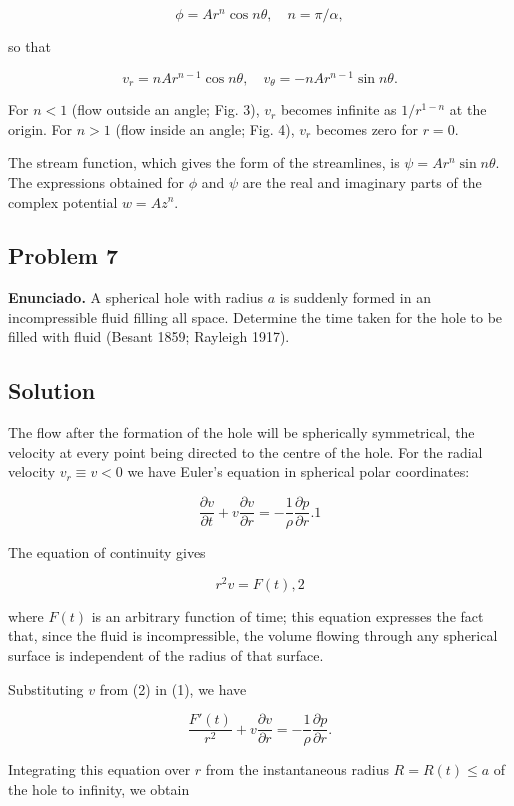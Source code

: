 \documentclass{article}
\begin{document}
$$
\phi = Ar^n \cos n\theta, \quad n = \pi/\alpha,
$$

so that

$$
v_r = nAr^{n-1} \cos n\theta, \quad v_\theta = -nAr^{n-1} \sin n\theta.
$$

For $n < 1$ (flow outside an angle; Fig. 3), $v_r$ becomes infinite as $1/r^{1-n}$ at the origin. For $n > 1$ (flow inside an angle; Fig. 4), $v_r$ becomes zero for $r = 0$.

The stream function, which gives the form of the streamlines, is $\psi = Ar^n \sin n\theta$. The expressions obtained for $\phi$ and $\psi$ are the real and imaginary parts of the complex potential $w = Az^n$.

\subsection*{Problem 7}

\textbf{Enunciado.} A spherical hole with radius $a$ is suddenly formed in an incompressible fluid filling all space. Determine the time taken for the hole to be filled with fluid (Besant 1859; Rayleigh 1917).

\subsection*{Solution}

The flow after the formation of the hole will be spherically symmetrical, the velocity at every point being directed to the centre of the hole. For the radial velocity $v_r \equiv v < 0$ we have Euler's equation in spherical polar coordinates:

$$
\frac{\partial v}{\partial t} + v \frac{\partial v}{\partial r} = -\frac{1}{\rho} \frac{\partial p}{\partial r}. {1}
$$

The equation of continuity gives

$$
r^2 v = F(t), {2}
$$

where $F(t)$ is an arbitrary function of time; this equation expresses the fact that, since the fluid is incompressible, the volume flowing through any spherical surface is independent of the radius of that surface.

Substituting $v$ from (2) in (1), we have

$$
\frac{F'(t)}{r^2} + v \frac{\partial v}{\partial r} = -\frac{1}{\rho} \frac{\partial p}{\partial r}.
$$

Integrating this equation over $r$ from the instantaneous radius $R = R(t) \leq a$ of the hole to infinity, we obtain
\end{document}
